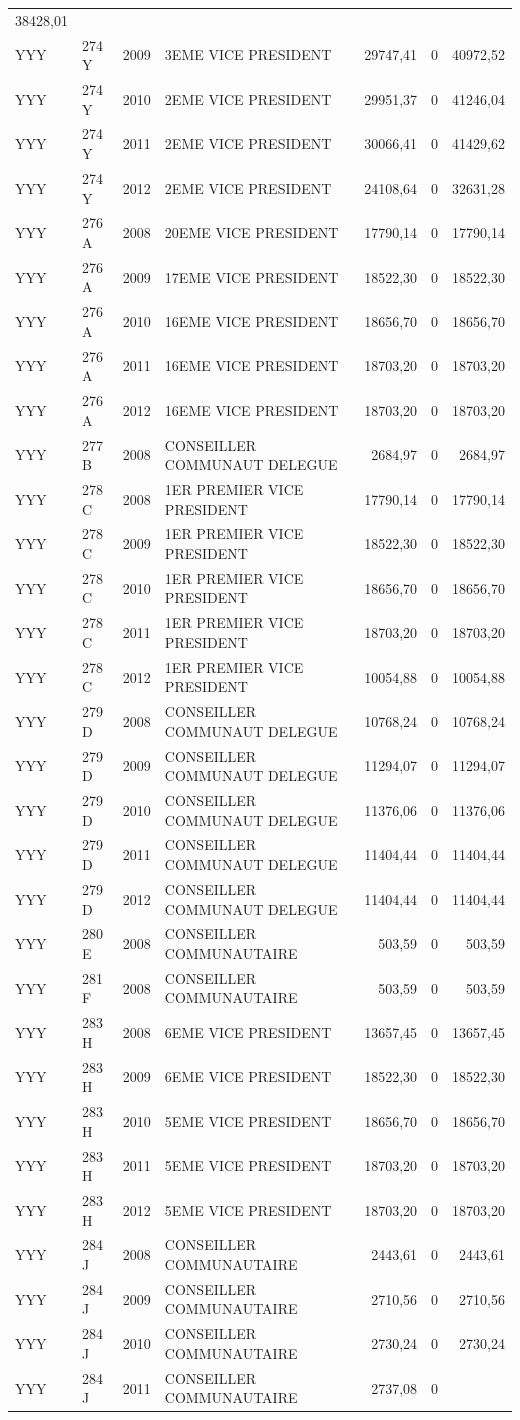 \begin{longtable}[]{@{}llrlrrr@{}}
38428,01\tabularnewline
YYY & 274 Y & 2009 & 3EME VICE PRESIDENT & 29747,41 & 0 &
40972,52\tabularnewline
YYY & 274 Y & 2010 & 2EME VICE PRESIDENT & 29951,37 & 0 &
41246,04\tabularnewline
YYY & 274 Y & 2011 & 2EME VICE PRESIDENT & 30066,41 & 0 &
41429,62\tabularnewline
YYY & 274 Y & 2012 & 2EME VICE PRESIDENT & 24108,64 & 0 &
32631,28\tabularnewline
YYY & 276 A & 2008 & 20EME VICE PRESIDENT & 17790,14 & 0 &
17790,14\tabularnewline
YYY & 276 A & 2009 & 17EME VICE PRESIDENT & 18522,30 & 0 &
18522,30\tabularnewline
YYY & 276 A & 2010 & 16EME VICE PRESIDENT & 18656,70 & 0 &
18656,70\tabularnewline
YYY & 276 A & 2011 & 16EME VICE PRESIDENT & 18703,20 & 0 &
18703,20\tabularnewline
YYY & 276 A & 2012 & 16EME VICE PRESIDENT & 18703,20 & 0 &
18703,20\tabularnewline
YYY & 277 B & 2008 & CONSEILLER COMMUNAUT DELEGUE & 2684,97 & 0 &
2684,97\tabularnewline
YYY & 278 C & 2008 & 1ER PREMIER VICE PRESIDENT & 17790,14 & 0 &
17790,14\tabularnewline
YYY & 278 C & 2009 & 1ER PREMIER VICE PRESIDENT & 18522,30 & 0 &
18522,30\tabularnewline
YYY & 278 C & 2010 & 1ER PREMIER VICE PRESIDENT & 18656,70 & 0 &
18656,70\tabularnewline
YYY & 278 C & 2011 & 1ER PREMIER VICE PRESIDENT & 18703,20 & 0 &
18703,20\tabularnewline
YYY & 278 C & 2012 & 1ER PREMIER VICE PRESIDENT & 10054,88 & 0 &
10054,88\tabularnewline
YYY & 279 D & 2008 & CONSEILLER COMMUNAUT DELEGUE & 10768,24 & 0 &
10768,24\tabularnewline
YYY & 279 D & 2009 & CONSEILLER COMMUNAUT DELEGUE & 11294,07 & 0 &
11294,07\tabularnewline
YYY & 279 D & 2010 & CONSEILLER COMMUNAUT DELEGUE & 11376,06 & 0 &
11376,06\tabularnewline
YYY & 279 D & 2011 & CONSEILLER COMMUNAUT DELEGUE & 11404,44 & 0 &
11404,44\tabularnewline
YYY & 279 D & 2012 & CONSEILLER COMMUNAUT DELEGUE & 11404,44 & 0 &
11404,44\tabularnewline
YYY & 280 E & 2008 & CONSEILLER COMMUNAUTAIRE & 503,59 & 0 &
503,59\tabularnewline
YYY & 281 F & 2008 & CONSEILLER COMMUNAUTAIRE & 503,59 & 0 &
503,59\tabularnewline
YYY & 283 H & 2008 & 6EME VICE PRESIDENT & 13657,45 & 0 &
13657,45\tabularnewline
YYY & 283 H & 2009 & 6EME VICE PRESIDENT & 18522,30 & 0 &
18522,30\tabularnewline
YYY & 283 H & 2010 & 5EME VICE PRESIDENT & 18656,70 & 0 &
18656,70\tabularnewline
YYY & 283 H & 2011 & 5EME VICE PRESIDENT & 18703,20 & 0 &
18703,20\tabularnewline
YYY & 283 H & 2012 & 5EME VICE PRESIDENT & 18703,20 & 0 &
18703,20\tabularnewline
YYY & 284 J & 2008 & CONSEILLER COMMUNAUTAIRE & 2443,61 & 0 &
2443,61\tabularnewline
YYY & 284 J & 2009 & CONSEILLER COMMUNAUTAIRE & 2710,56 & 0 &
2710,56\tabularnewline
YYY & 284 J & 2010 & CONSEILLER COMMUNAUTAIRE & 2730,24 & 0 &
2730,24\tabularnewline
YYY & 284 J & 2011 & CONSEILLER COMMUNAUTAIRE & 2737,08 & 0 &

\end{longtable}
